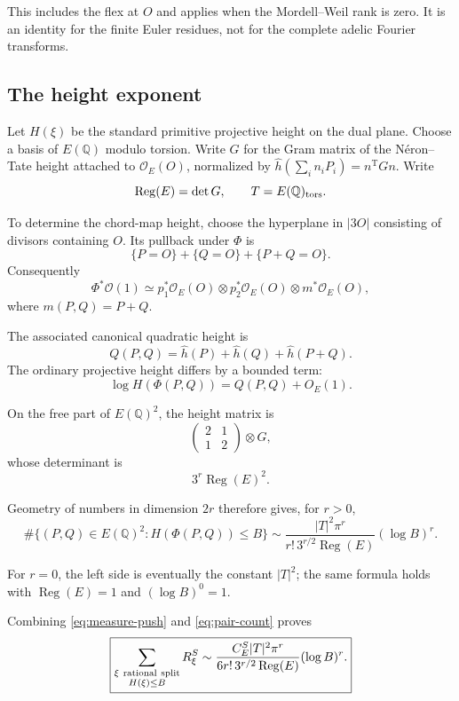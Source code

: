\documentclass[11pt]{article}
\begin{document}
This includes the flex at $O$ and applies
when the Mordell--Weil rank is zero.
It is an identity for the finite Euler
residues, not for the complete adelic
Fourier transforms.

\subsection{The height exponent}

Let $H(\xi)$ be the standard primitive
projective height on the dual plane.
Choose a basis of $E(\mathbb Q)$ modulo torsion. Write $G$ for the
Gram matrix of the N\'eron--Tate height attached to $\mathcal O_E(O)$,
normalized by $\hat h(\sum_i n_i P_i)=n^{\mathrm T}Gn$. Write
\[
\operatorname{Reg}(E)=\det G,
\qquad T=E(\mathbb Q)_{\rm tors}.
\]

To determine the chord-map height,
choose the hyperplane in $|3O|$
consisting of divisors containing $O$.
Its pullback under $\Phi$ is
\[
\{P=O\}+\{Q=O\}+\{P+Q=O\}.
\]
Consequently
\[
\Phi^*\mathcal O(1)\simeq
p_1^*\mathcal O_E(O)
\otimes p_2^*\mathcal O_E(O)
\otimes m^*\mathcal O_E(O),
\]
where $m(P,Q)=P+Q$.

The associated canonical quadratic height is
\[
Q(P,Q)=
\hat h(P)+\hat h(Q)+\hat h(P+Q).
\]
The ordinary projective height differs by
a bounded term:
\begin{equation}\label{eq:chord-height}
\log H(\Phi(P,Q))=Q(P,Q)+O_E(1).
\end{equation}

On the free part of $E(\mathbb Q)^2$,
the height matrix is
\[
\begin{pmatrix}2&1\\1&2\end{pmatrix}
\otimes G,
\]
whose determinant is
\[
3^r\operatorname{Reg}(E)^2.
\]

Geometry of numbers in dimension $2r$
therefore gives, for $r>0$,
\begin{equation}\label{eq:pair-count}
\#\{(P,Q)\in E(\mathbb Q)^2:
H(\Phi(P,Q))\le B\}
\sim
\frac{|T|^2\pi^r}
{r!\,3^{r/2}\operatorname{Reg}(E)}
(\log B)^r.
\end{equation}

For $r=0$, the left side is eventually
the constant $|T|^2$; the same formula
holds with $\operatorname{Reg}(E)=1$
and $(\log B)^0=1$.

Combining \eqref{eq:measure-push}
and \eqref{eq:pair-count} proves
\begin{equation}\label{eq:weighted-count}
\boxed{
\sum_{\substack{\xi\ {\rm rational\ split}\\
H(\xi)\le B}}R_\xi^S
\sim
\frac{C_E^S|T|^2\pi^r}
{6r!\,3^{r/2}\operatorname{Reg}(E)}
(\log B)^r.
}
\end{equation}
\end{document}
